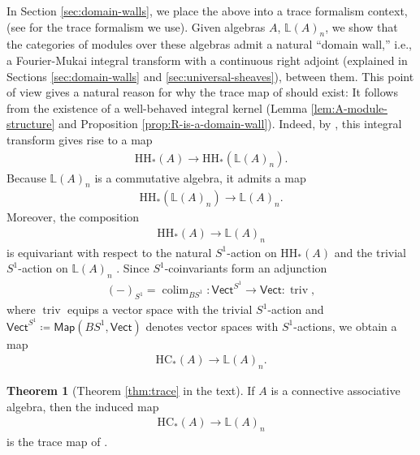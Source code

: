 \documentclass{article}
\numberwithin{equation}{section}
\theoremstyle{quest}
\theoremstyle{definition}
\newtheorem{thm}{Theorem}[section]
\theoremstyle{remark}
\DeclareMathOperator{\colim}{colim}
\DeclareMathOperator{\triv}{triv}
\begin{document}
In Section \ref{sec:domain-walls}, we place the above into a trace formalism context, (see \cite{HSS,nonlinear-trace} for the trace formalism we use). Given algebras $A$, $\mathbb{L}(A)_n$, we show that the categories of modules over these algebras admit a  natural ``domain wall,'' i.e., a Fourier-Mukai integral transform with a continuous right adjoint (explained in Sections \ref{sec:domain-walls} and \ref{sec:universal-sheaves}), between them. This point of view gives a natural reason for why the trace map of \cite{BKR} should exist: It follows from the existence of a well-behaved integral kernel (Lemma \ref{lem:A-module-structure} and Proposition \ref{prop:R-is-a-domain-wall}). Indeed, by \cite[Section 3.4]{nonlinear-trace}, this integral transform gives rise to a map
\begin{align*}
	\mathrm H\mathrm H_*(A)\to \mathrm H\mathrm H_*(\mathbb{L}(A)_n).
\end{align*} 
Because $\mathbb{L}(A)_n$ is a commutative algebra, it admits a map
\begin{align*}
	\mathrm H\mathrm H_*(\mathbb{L}(A)_n)\to \mathbb{L}(A)_n.
\end{align*} 
Moreover, the composition
\begin{align*}
	\mathrm H\mathrm H_*(A)\to \mathbb{L}(A)_n
\end{align*} 
is equivariant with respect to the natural $S^1$-action on $\mathrm H\mathrm H_*(A)$ and the trivial $S^1$-action on $\mathbb{L}(A)_n$ \cite[Theorem 2.14]{HSS}. Since $S^1$-coinvariants form an adjunction \cite[Section I.1]{NS}
\begin{align*}
	(-)_{S^1}=\colim_{BS^1}:\mathsf{Vect}^{S^1}\to  \mathsf{Vect}:\triv,
\end{align*} 
where $\triv$ equips a vector space with the trivial $S^1$-action and $\mathsf{Vect}^{S^1}\coloneqq \mathsf{Map}(BS^1,\mathsf{Vect})$ denotes vector spaces with $S^1$-actions, we obtain a map
\begin{align*}
	\mathrm{HC}_*(A)\to \mathbb{L}(A)_n.
\end{align*} 
\begin{thm}[Theorem \ref{thm:trace} in the text]\label{thm:intro-trace-map}
	If $A$ is a connective associative algebra, then the induced map
\begin{align*}
	\mathrm H\mathrm C_*(A)\to \mathbb{L}(A)_n
\end{align*} 
is the trace map of \cite{BKR}.
\end{thm}
\end{document}
